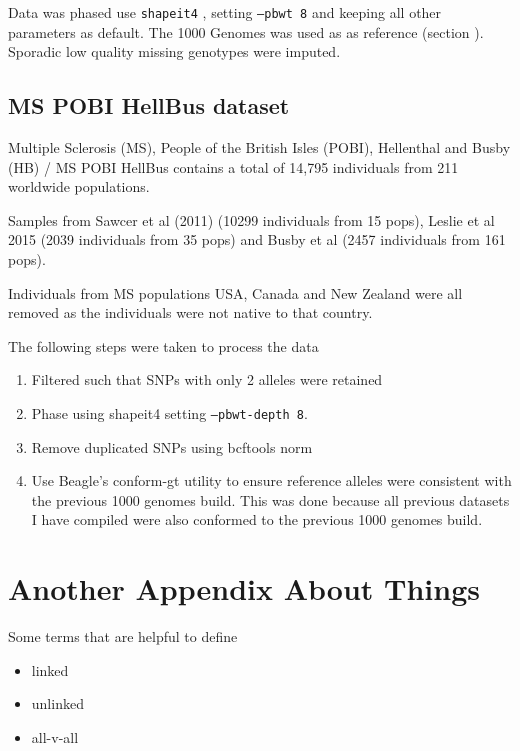 Data was phased use \texttt{shapeit4} \cite{delaneau2018integrative}, setting \texttt{--pbwt 8} and keeping all other parameters as default. The 1000 Genomes was used as as reference (section \cite{1000genomesdataset}). Sporadic low quality missing genotypes were imputed. 



\section{MS POBI HellBus dataset} \label{sssec:MSPOBIHellBus}


Multiple Sclerosis (MS), People of the British Isles (POBI), Hellenthal and Busby (HB) / MS POBI HellBus contains a total of 14,795 individuals from 211 worldwide populations. 

Samples from Sawcer et al (2011) \cite{Sawcer2011} (10299 individuals from 15 pops), Leslie et al 2015 \cite{Leslie2015} (2039 individuals from 35 pops) and Busby et al (2457 individuals from  161 pops). 

Individuals from MS populations USA, Canada and New Zealand were all removed as the individuals were not native to that country.

The following steps were taken to process the data

\begin{enumerate}
\item Filtered such that SNPs with only 2 alleles were retained
\item Phase using shapeit4 \cite{delaneau2018integrative} setting \texttt{--pbwt-depth 8}.
\item Remove duplicated SNPs using bcftools norm \cite{li2009sequence} 
\item Use Beagle's conform-gt utility to ensure reference alleles were consistent with the previous 1000 genomes build. This was done because all previous datasets I have compiled were also conformed to the previous 1000 genomes build. 
\end{enumerate}

\chapter{Another Appendix About Things}
\label{appendixlabel2}

Some terms that are helpful to define

\begin{itemize}
\item linked
\item unlinked
\item all-v-all
\end{itemize}



